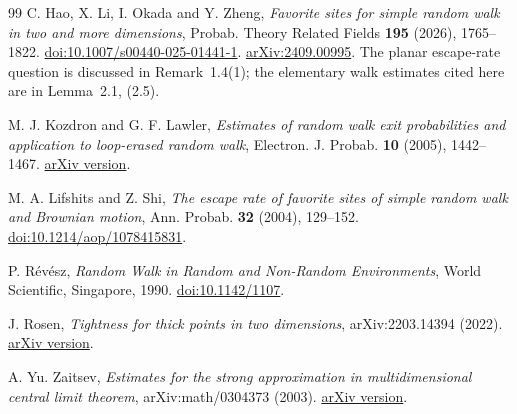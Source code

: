 \begin{thebibliography}{99}
C. Hao, X. Li, I. Okada and Y. Zheng,
\emph{Favorite sites for simple random walk in two and more dimensions},
Probab. Theory Related Fields \textbf{195} (2026), 1765--1822.
\href{https://doi.org/10.1007/s00440-025-01441-1}{doi:10.1007/s00440-025-01441-1}.
\href{https://arxiv.org/abs/2409.00995}{arXiv:2409.00995}.
The planar escape-rate question is discussed in Remark~1.4(1); the
elementary walk estimates cited here are in Lemma~2.1, (2.5).

M. J. Kozdron and G. F. Lawler,
\emph{Estimates of random walk exit probabilities and application to loop-erased
random walk},
Electron. J. Probab. \textbf{10} (2005), 1442--1467.
\href{https://arxiv.org/abs/math/0501189}{arXiv version}.

M. A. Lifshits and Z. Shi,
\emph{The escape rate of favorite sites of simple random walk and Brownian
motion},
Ann. Probab. \textbf{32} (2004), 129--152.
\href{https://doi.org/10.1214/aop/1078415831}{doi:10.1214/aop/1078415831}.

P. R\'ev\'esz,
\emph{Random Walk in Random and Non-Random Environments},
World Scientific, Singapore, 1990.
\href{https://doi.org/10.1142/1107}{doi:10.1142/1107}.

J. Rosen,
\emph{Tightness for thick points in two dimensions},
arXiv:2203.14394 (2022).
\href{https://arxiv.org/abs/2203.14394}{arXiv version}.

A. Yu. Zaitsev,
\emph{Estimates for the strong approximation in multidimensional central
limit theorem},
arXiv:math/0304373 (2003).
\href{https://arxiv.org/abs/math/0304373}{arXiv version}.

\end{thebibliography}

